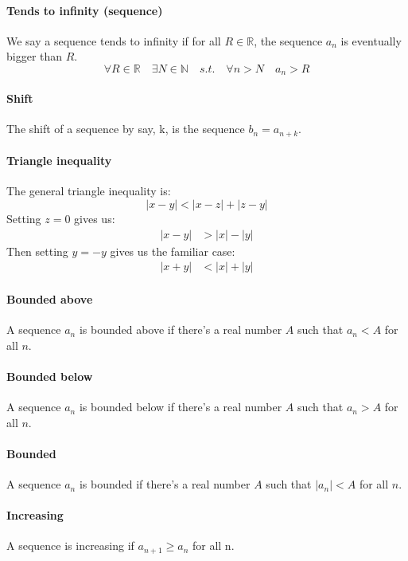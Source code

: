 \documentclass{scrartcl}
\newcommand{\R}{\mathbb{R}}
\newcommand{\N}{\mathbb{N}}
\begin{document}
\paragraph{Tends to infinity (sequence)}
We say a sequence tends to infinity if for all $ R \in \R $, the sequence $ a_{n} $ is eventually bigger than $ R $.
\begin{equation}
\forall R \in \R \quad \exists N \in \N \quad s.t. \quad \forall n > N \quad a_{n} > R
\end{equation}

\paragraph{Shift}
The shift of a sequence by say, k, is the sequence $ b_{n} = a_{n + k} $.

\paragraph{Triangle inequality}
The general triangle inequality is:
\begin{equation}
|x - y| < |x - z| + |z - y|
\end{equation}
Setting $ z = 0 $ gives us:
\begin{align}
|x - y| & > |x| - |y|
\end{align}
Then setting $ y = - y $ gives us the familiar case:
\begin{align}
|x + y| & < |x| + |y|
\end{align}

\paragraph{Bounded above}
A sequence $ a_{n} $ is bounded above if there's a real number $ A $ such that $ a_{n} < A $ for all $ n $.

\paragraph{Bounded below}
A sequence $ a_{n} $ is bounded below if there's a real number $ A $ such that $ a_{n} > A $ for all $ n $.

\paragraph{Bounded}
A sequence $ a_{n} $ is bounded if there's a real number $ A $ such that $ |a_{n}| < A $ for all $ n $.

\paragraph{Increasing}
A sequence is increasing if $ a_{n + 1} \geq a_{n} $ for all n.
\end{document}
